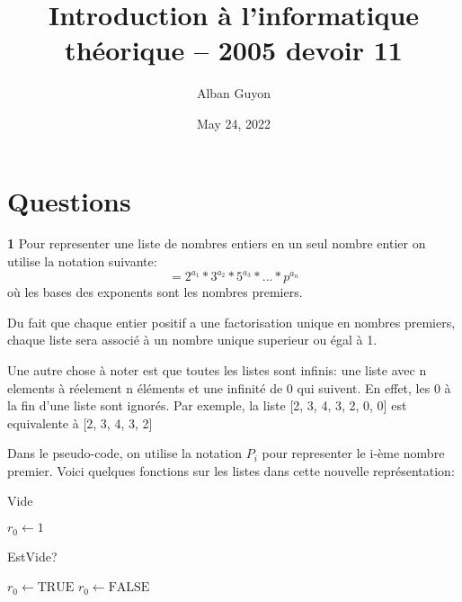 \documentclass{article}
\title{Introduction à l'informatique théorique -- 2005 devoir 11}
\author{Alban Guyon}
\date{May 24, 2022}
\begin{document}
    \maketitle
    
    \section{Questions}
    
    \textbf{1}
    Pour representer une liste de nombres entiers en un seul nombre entier on utilise la notation suivante:
    \begin{equation}
    [a_1, a_2, a_3, ..., a_n, 0, 0, 0, ...] = 2^{a_1} * 3^{a_2} * 5^{a_3} * ... * p^{a_n}
    \end{equation}
    où les bases des exponents sont les nombres premiers.

    Du fait que chaque entier positif a une factorisation unique en nombres premiers, chaque liste
    sera associé à un nombre unique superieur ou égal à 1.

    Une autre chose à noter est que toutes les listes sont infinis: une liste avec n elements à réelement n
    éléments et une infinité de 0 qui suivent. En effet, les 0 à la fin d'une liste sont ignorés. 
    Par exemple, la liste [2, 3, 4, 3, 2, 0, 0] est equivalente à [2, 3, 4, 3, 2]

    Dans le pseudo-code, on utilise la notation $P_i$ pour representer le i-ème nombre premier.	
    Voici quelques fonctions sur les listes dans cette nouvelle représentation:

    \begin{algorithm}[H]
        \caption{Vide}\label{Vide}
        \begin{algorithmic}
        \State $\textit{$r_0$} \gets \text{1}$
        \EndProcedure
        \end{algorithmic}
    \end{algorithm}

    \begin{algorithm}[H]
        \caption{EstVide?}\label{EstVide?}
        \begin{algorithmic}
            \State $\textit{$r_0$} \gets \text{TRUE}$
        \Else {}
            \State $\textit{$r_0$} \gets \text{FALSE}$
        \EndIf
        \EndProcedure
        \end{algorithmic}
    \end{algorithm}
\end{document}
